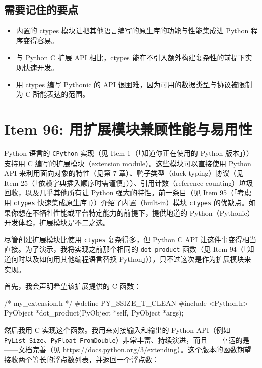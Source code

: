 \subsection{需要记住的要点}

\begin{itemize}
\item 内置的 ctypes 模块让把其他语言编写的原生库的功能与性能集成进 Python 程序变得容易。
\item 与 Python C 扩展 API 相比，ctypes 能在不引入额外构建复杂性的前提下实现快速开发。
\item 用 ctypes 编写 Pythonic 的 API 很困难，因为可用的数据类型与协议被限制为 C 所能表达的范围。
\end{itemize}

\section{Item 96: 用扩展模块兼顾性能与易用性}

Python 语言的 \texttt{CPython} 实现（见 Item 1（「知道你正在使用的 Python 版本」））支持用 C 编写的扩展模块（extension module）。这些模块可以直接使用 Python API 来利用面向对象的特性（见第 7 章）、鸭子类型（duck typing）协议（见 Item 25（「依赖字典插入顺序时需谨慎」））、引用计数（reference counting）垃圾回收，以及几乎其他所有让 Python 强大的特性。前一条目（见 Item 95（「考虑用 \texttt{ctypes} 快速集成原生库」））介绍了内置（built-in）模块 \texttt{ctypes} 的优缺点。如果你想在不牺牲性能或平台特定能力的前提下，提供地道的 Python（Pythonic）开发体验，扩展模块是不二之选。

尽管创建扩展模块比使用 \texttt{ctypes} 复杂得多，但 Python C API 让这件事变得相当直接。为了演示，我将实现之前那个相同的 \texttt{dot\_product} 函数（见 Item 94（「知道何时以及如何用其他编程语言替换 Python」）），只不过这次是作为扩展模块来实现。

首先，我会声明希望该扩展提供的 C 函数：

\begin{codebox}[c]
/* my_extension.h */
#define PY_SSIZE_T_CLEAN
#include <Python.h>
PyObject *dot_product(PyObject *self, PyObject *args);
\end{codebox}

然后我用 C 实现这个函数。我用来对接输入和输出的 Python API（例如 \texttt{PyList\_Size}、\texttt{PyFloat\_FromDouble}）非常丰富、持续演进，而且——幸运的是——文档完善（见 https://docs.python.org/3/extending）。这个版本的函数期望接收两个等长的浮点数列表，并返回一个浮点数：


